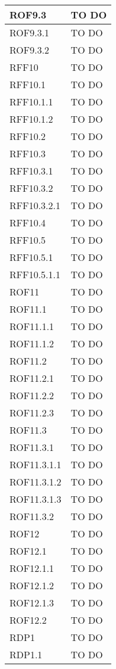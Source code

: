 \begin{center}
\begin{longtable}{| p{4cm} | p{8cm} |}
ROF9.3   &  TO DO \\
\hline
ROF9.3.1   &  TO DO \\
\hline
ROF9.3.2   &  TO DO \\
\hline
RFF10   &  TO DO \\
\hline
RFF10.1   &  TO DO \\
\hline
RFF10.1.1   &  TO DO \\
\hline
RFF10.1.2   &  TO DO \\
\hline
RFF10.2   &  TO DO \\
\hline
RFF10.3   &  TO DO \\
\hline
RFF10.3.1   &  TO DO \\
\hline
RFF10.3.2   &  TO DO \\
\hline
RFF10.3.2.1   &  TO DO \\
\hline
RFF10.4   &  TO DO \\
\hline
RFF10.5   &  TO DO \\
\hline
RFF10.5.1   &  TO DO \\
\hline
RFF10.5.1.1   &  TO DO \\
\hline
ROF11   &  TO DO \\
\hline
ROF11.1   &  TO DO \\
\hline
ROF11.1.1   &  TO DO \\
\hline
ROF11.1.2   &  TO DO \\
\hline
ROF11.2   &  TO DO \\
\hline
ROF11.2.1   &  TO DO \\
\hline
ROF11.2.2   &  TO DO \\
\hline
ROF11.2.3   &  TO DO \\
\hline
ROF11.3   &  TO DO \\
\hline
ROF11.3.1   &  TO DO \\
\hline
ROF11.3.1.1   &  TO DO \\
\hline
ROF11.3.1.2   &  TO DO \\
\hline
ROF11.3.1.3   &  TO DO \\
\hline
ROF11.3.2   &  TO DO \\
\hline
ROF12   &  TO DO \\
\hline
ROF12.1   &  TO DO \\
\hline
ROF12.1.1   &  TO DO \\
\hline
ROF12.1.2   &  TO DO \\
\hline
ROF12.1.3   &  TO DO \\
\hline
ROF12.2   &  TO DO \\
\hline
RDP1   &  TO DO \\
\hline
RDP1.1   &  TO DO \\

\end{longtable}
\end{center}
